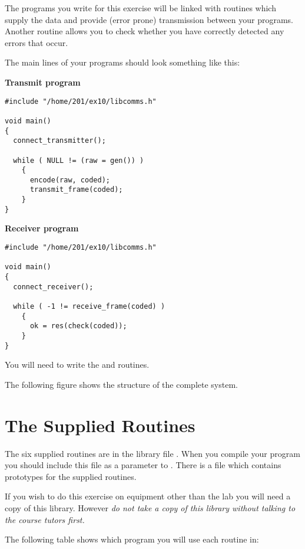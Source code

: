 \documentclass[a4paper,10pt]{article}
\begin{document}
The programs you write for this exercise will be linked with routines which
supply the data and provide (error prone) transmission between your
programs.  Another routine allows you to check whether you have correctly
detected any errors that occur.

\newpage
The main lines of your programs should look something like this:

{\bf Transmit program}

\begin{verbatim}
#include "/home/201/ex10/libcomms.h"

void main()
{
  connect_transmitter();

  while ( NULL != (raw = gen()) )
    {
      encode(raw, coded);
      transmit_frame(coded);
    }
}
\end{verbatim}

{\bf Receiver program}

\begin{verbatim}
#include "/home/201/ex10/libcomms.h"

void main()
{
  connect_receiver();

  while ( -1 != receive_frame(coded) )
    {
      ok = res(check(coded));
    }
}
\end{verbatim}

You will need to write the  and  routines.

The following figure shows the structure of the complete system.

\begin{center}
\end{center}

\newpage
\section{The Supplied Routines}

The six supplied routines are in the library file
.  When you compile your program you
should include this file as a parameter to .  There is a
 file which contains prototypes for the
supplied routines.

If you wish to do this exercise on equipment other than the lab you
will need a copy of this library.  However {\em do not take a copy of
this library without talking to the course tutors first.}

The following table shows which program you will use each routine in:
\vspace{1cm}
\end{document}
